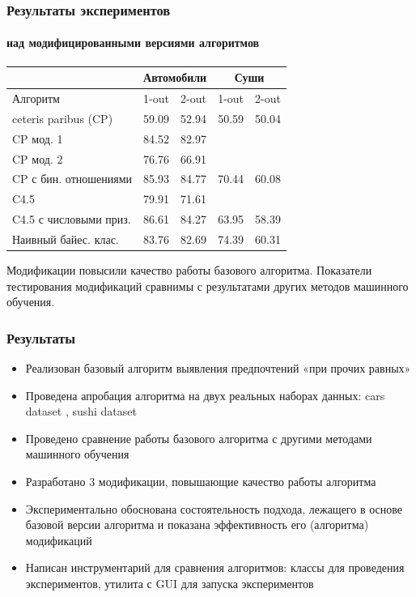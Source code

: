 \documentclass[xcolor=table,handout]{beamer}
\theoremstyle{definition}
\begin{document}
	\begin{frame}
		\frametitle{Результаты экспериментов}
		\framesubtitle{над модифицированными версиями алгоритмов}
		\begin{center}
		\begin{tabular}{|l|ll|ll|}
			\hline
			& \multicolumn{2}{c|}{Автомобили} & \multicolumn{2}{c|}{Суши} \\ \hline
			Алгоритм               & 1-out          & 2-out          & 1-out       & 2-out       \\ \hline
			ceteris paribus (CP)   & 59.09          & 52.94          & 50.59       & 50.04       \\
			\rowcolor[HTML]{CEFFCE} 
			CP мод. 1              & 84.52          & 82.97          &             &             \\
			\rowcolor[HTML]{CEFFCE} 
			CP мод. 2              & 76.76          & 66.91          &             &             \\
			\rowcolor[HTML]{CEFFCE} 
			CP с бин. отношениями  & 85.93          & 84.77          & 70.44       & 60.08       \\
			C4.5                   & 79.91          & 71.61          &             &             \\
			\rowcolor[HTML]{CEFFCE} 
			C4.5 с числовыми приз. & 86.61          & 84.27          & 63.95       & 58.39       \\
			Наивный байес. клас.   & 83.76          & 82.69          & 74.39       & 60.31       \\ \hline
		\end{tabular}
		\end{center}
		
		Модификации повысили качество работы базового алгоритма. Показатели тестирования модификаций сравнимы с результатами других методов машинного обучения.
	\end{frame}
	
	\begin{frame}
		\frametitle{Результаты}
		\begin{itemize}
			\item Реализован базовый алгоритм выявления предпочтений «при прочих равных»
			\item Проведена апробация алгоритма на двух реальных наборах данных: cars dataset \cite{dataset:Abbasnejad:2013}, sushi dataset \cite{Kamishima:2003} 
			\item Проведено сравнение работы базового алгоритма с другими методами машинного обучения
			\item Разработано 3 модификации, повышающие качество работы алгоритма
			\item Экспериментально обоснована состоятельность подхода, лежащего в основе базовой версии алгоритма и показана  эффективность его (алгоритма) модификаций
		\end{itemize}
		\pause
		\begin{itemize}
			\item {\color{gray} Написан инструментарий для сравнения алгоритмов: классы для проведения экспериментов, утилита с GUI для запуска экспериментов}
		\end{itemize}
	\end{frame}
		
\end{document}
